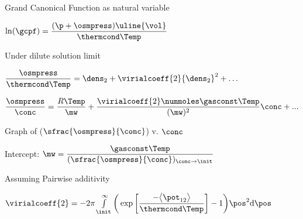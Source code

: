 \begin{bigmdframed}
\begin{listone}
\begin{listtwo}
\begin{listthree}
			\item Grand Canonical Function as natural variable
            
			\begin{listfour}
				
                \item $\ln(\gcpf) = \dfrac{(\p + \osmpress)\uline{\vol}}{\thermcond\Temp} $
                
    		\end{listfour}
            
			\item Under dilute solution limit
    			\begin{listfour}
                
				\item $\dfrac{\osmpress}{\thermcond\Temp} = \dens_{2} + \virialcoeff{2}{\dens_{2}}^2 + \hdots $
                
				\item $\dfrac{\osmpress}{\conc} = \dfrac{R\Temp}{\mw} + \dfrac{\virialcoeff{2}\nummoles \gasconst\Temp}{(\mw)^2}\conc + ...$
                
				\begin{listfive}
                
					\item Graph of ($\sfrac{\osmpress}{\conc}$) v. $\conc$
					
                    \begin{listsix}
                    
						\item Intercept: $\mw = \dfrac{\gasconst\Temp}{(\sfrac{\osmpress}{\conc})_{\conc\rightarrow\init}}$
    					
                     \end{listsix}
                     
				\end{listfive}
                
			\end{listfour}
            
			\item Assuming Pairwise additivity
            
			\begin{listfour}
            
				\item $\virialcoeff{2} = -2\pi\int\limits_{\init}^{\infty}\bigg(\exp\bigg[\dfrac{-\big\langle\pot_{12}\big\rangle}{\thermcond\Temp}\bigg]-1\bigg)\pos^2 \mathrm{d}\pos$
				

\end{listfour}
\end{listthree}
\end{listtwo}
\end{listone}
\end{bigmdframed}
